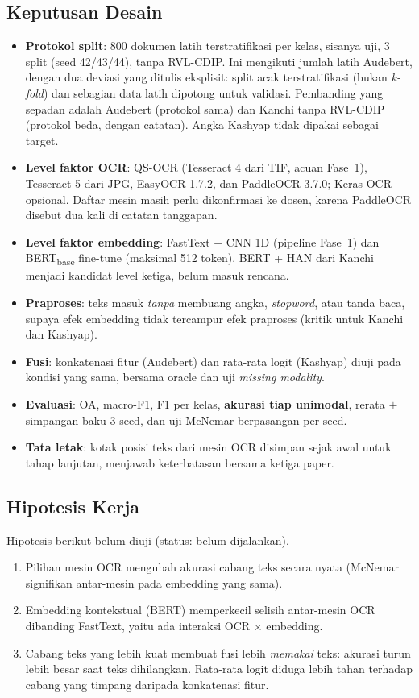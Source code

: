 \subsection{Keputusan Desain}
\begin{itemize}
  \item \textbf{Protokol split}: 800 dokumen latih terstratifikasi per kelas, sisanya uji,
        3 split (seed 42/43/44), tanpa RVL-CDIP. Ini mengikuti jumlah latih Audebert,
        dengan dua deviasi yang ditulis eksplisit: split acak terstratifikasi (bukan
        \emph{k-fold}) dan sebagian data latih dipotong untuk validasi. Pembanding yang
        sepadan adalah Audebert (protokol sama) dan Kanchi tanpa RVL-CDIP (protokol beda,
        dengan catatan). Angka Kashyap tidak dipakai sebagai target.
  \item \textbf{Level faktor OCR}: QS-OCR (Tesseract 4 dari TIF, acuan Fase~1), Tesseract 5
        dari JPG, EasyOCR 1.7.2, dan PaddleOCR 3.7.0; Keras-OCR opsional. Daftar mesin
        masih perlu dikonfirmasi ke dosen, karena PaddleOCR disebut dua kali di catatan
        tanggapan.
  \item \textbf{Level faktor embedding}: FastText + CNN 1D (pipeline Fase~1) dan
        BERT\textsubscript{base} fine-tune (maksimal 512 token). BERT + HAN dari Kanchi
        menjadi kandidat level ketiga, belum masuk rencana.
  \item \textbf{Praproses}: teks masuk \emph{tanpa} membuang angka, \emph{stopword}, atau
        tanda baca, supaya efek embedding tidak tercampur efek praproses (kritik untuk
        Kanchi dan Kashyap).
  \item \textbf{Fusi}: konkatenasi fitur (Audebert) dan rata-rata logit (Kashyap) diuji
        pada kondisi yang sama, bersama oracle dan uji \emph{missing modality}.
  \item \textbf{Evaluasi}: OA, macro-F1, F1 per kelas, \textbf{akurasi tiap unimodal}, rerata
        $\pm$ simpangan baku 3 seed, dan uji McNemar berpasangan per seed.
  \item \textbf{Tata letak}: kotak posisi teks dari mesin OCR disimpan sejak awal untuk
        tahap lanjutan, menjawab keterbatasan bersama ketiga paper.
\end{itemize}

\subsection{Hipotesis Kerja}
Hipotesis berikut belum diuji (status: belum-dijalankan).
\begin{enumerate}[label=H\arabic*.]
  \item Pilihan mesin OCR mengubah akurasi cabang teks secara nyata (McNemar signifikan
        antar-mesin pada embedding yang sama).
  \item Embedding kontekstual (BERT) memperkecil selisih antar-mesin OCR dibanding
        FastText, yaitu ada interaksi OCR $\times$ embedding.
  \item Cabang teks yang lebih kuat membuat fusi lebih \emph{memakai} teks: akurasi turun
        lebih besar saat teks dihilangkan. Rata-rata logit diduga lebih tahan terhadap
        cabang yang timpang daripada konkatenasi fitur.
\end{enumerate}

